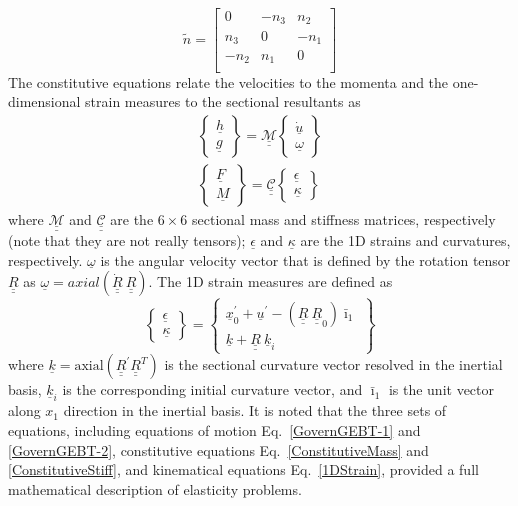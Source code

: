 \documentclass{aiaa-tc}
\newcommand{\tens}[1]{\underline{\underline{#1}}}
\renewcommand{\vec}[1]{\underline{#1}}
\renewcommand{\skew}[1]{\widetilde{#1}}
\begin{document}
\[
	\skew{n} = 
	     		\begin{bmatrix}
			0 & -n_3 & n_2 \\
			n_3 & 0 & -n_1 \\
			-n_2 & n_1 & 0\\
			\end{bmatrix}	
\]
The constitutive equations relate the velocities to the momenta and the one-dimensional strain measures to the sectional resultants as
\begin{align}
	\label{ConstitutiveMass}
	\begin{Bmatrix}
	\underline{h} \\
	\underline{g}
	\end{Bmatrix}
	= \underline{\underline{\mathcal{M}}} \begin{Bmatrix}
	\dot{\underline{u}} \\
	\underline{\omega}
	\end{Bmatrix} \\
	\label{ConstitutiveStiff}
	\begin{Bmatrix}
	\underline{F} \\
	\underline{M}
	\end{Bmatrix}
	= \underline{\underline{\mathcal{C}}} \begin{Bmatrix}
	\underline{\epsilon} \\
	\underline{\kappa}
	\end{Bmatrix}
\end{align}
where $\underline{\underline{\mathcal{M}}}$ and
$\underline{\underline{\mathcal{C}}}$ are the $6 \times 6$ sectional mass
and stiffness matrices, respectively (note that they are not really tensors);
$\underline{\epsilon}$ and $\underline{\kappa}$ are the 1D strains and
curvatures, respectively. $\underline{\omega}$ is the angular velocity
vector that is defined by the rotation tensor $\underline{\underline{R}}$ as
$\underline{\omega} =
axial(\dot{\underline{\underline{R}}}~\underline{\underline{R}})$. The 1D
strain measures are defined as
\begin{equation}
    \label{1DStrain}
    \begin{Bmatrix}
        \vec{\epsilon} \\
        \vec{\kappa}
    \end{Bmatrix}
    =
    \begin{Bmatrix}
        \vec{x}^\prime_0 + \vec{u}^\prime - (\tens{R} ~\tens{R}_0) \bar{\imath}_1 \\
        \vec{k} + \tens{R}~ \vec{k}_i
    \end{Bmatrix}
\end{equation}
where $\vec{k} = \text{axial} (\tens{R}^\prime \tens{R}^T)$ is the sectional
curvature vector resolved in the inertial basis, $\vec{k}_i$ is the
corresponding initial curvature vector, and $\bar{\imath}_1$ is the unit
vector along $x_1$ direction in the inertial basis. It is noted that the
three sets of equations, including equations of motion
Eq.~\eqref{GovernGEBT-1} and \eqref{GovernGEBT-2}, constitutive equations
Eq.~\eqref{ConstitutiveMass} and \eqref{ConstitutiveStiff}, and kinematical
equations Eq.~\eqref{1DStrain}, provided a full mathematical description of elasticity problems. 
\end{document}
